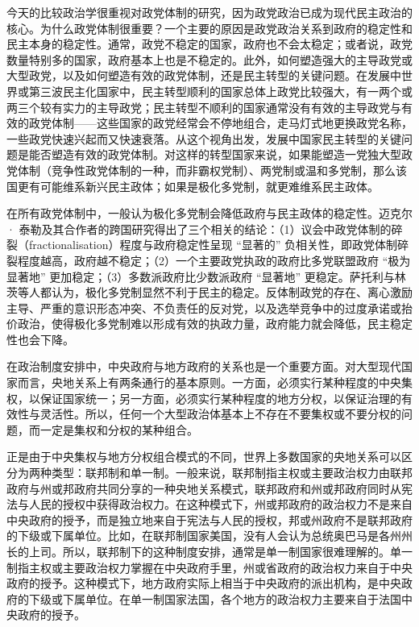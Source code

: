 今天的比较政治学很重视对政党体制的研究，因为政党政治已成为现代民主政治的核心。为什么政党体制很重要？一个主要的原因是政党政治关系到政府的稳定性和民主本身的稳定性。通常，政党不稳定的国家，政府也不会太稳定；或者说，政党数量特别多的国家，政府基本上也是不稳定的。此外，如何塑造强大的主导政党或大型政党，以及如何塑造有效的政党体制，还是民主转型的关键问题。在发展中世界或第三波民主化国家中，民主转型顺利的国家总体上政党比较强大，有一两个或两三个较有实力的主导政党；民主转型不顺利的国家通常没有有效的主导政党与有效的政党体制——这些国家的政党经常会不停地组合，走马灯式地更换政党名称，一些政党快速兴起而又快速衰落。从这个视角出发，发展中国家民主转型的关键问题是能否塑造有效的政党体制。对这样的转型国家来说，如果能塑造一党独大型政党体制（竞争性政党体制的一种，而非霸权党制）、两党制或温和多党制，那么该国更有可能维系新兴民主政体；如果是极化多党制，就更难维系民主政体。

在所有政党体制中，一般认为极化多党制会降低政府与民主政体的稳定性。迈克尔 · 泰勒及其合作者的跨国研究得出了三个相关的结论：（1）议会中政党体制的碎裂（fractionalisation）程度与政府稳定性呈现 “显著的” 负相关性，即政党体制碎裂程度越高，政府越不稳定；（2）一个主要政党执政的政府比多党联盟政府 “极为显著地” 更加稳定；（3）多数派政府比少数派政府 “显著地” 更稳定。萨托利与林茨等人都认为，极化多党制显然不利于民主的稳定。反体制政党的存在、离心激励主导、严重的意识形态冲突、不负责任的反对党，以及选举竞争中的过度承诺或抬价政治，使得极化多党制难以形成有效的执政力量，政府能力就会降低，民主稳定性也会下降。


在政治制度安排中，中央政府与地方政府的关系也是一个重要方面。对大型现代国家而言，央地关系上有两条通行的基本原则。一方面，必须实行某种程度的中央集权，以保证国家统一；另一方面，必须实行某种程度的地方分权，以保证治理的有效性与灵活性。所以，任何一个大型政治体基本上不存在不要集权或不要分权的问题，而一定是集权和分权的某种组合。

正是由于中央集权与地方分权组合模式的不同，世界上多数国家的央地关系可以区分为两种类型：联邦制和单一制。一般来说，联邦制指主权或主要政治权力由联邦政府与州或邦政府共同分享的一种央地关系模式，联邦政府和州或邦政府同时从宪法与人民的授权中获得政治权力。在这种模式下，州或邦政府的政治权力不是来自中央政府的授予，而是独立地来自于宪法与人民的授权，邦或州政府不是联邦政府的下级或下属单位。比如，在联邦制国家美国，没有人会认为总统奥巴马是各州州长的上司。所以，联邦制下的这种制度安排，通常是单一制国家很难理解的。单一制指主权或主要政治权力掌握在中央政府手里，州或省政府的政治权力来自于中央政府的授予。这种模式下，地方政府实际上相当于中央政府的派出机构，是中央政府的下级或下属单位。在单一制国家法国，各个地方的政治权力主要来自于法国中央政府的授予。

